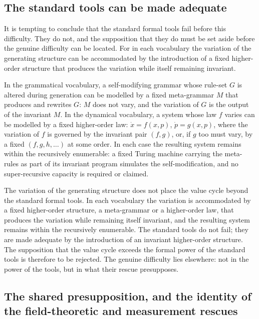 \subsection{The standard tools can be made adequate}
\label{p10:sec:mod-rescue}

It is tempting to conclude that the standard formal tools fail before this difficulty. They do not, and the supposition that they do must be set aside before the genuine difficulty can be located. For in each vocabulary the variation of the generating structure can be accommodated by the introduction of a fixed higher-order structure that produces the variation while itself remaining invariant.

In the grammatical vocabulary, a self-modifying grammar whose rule-set $G$ is altered during generation can be modelled by a fixed meta-grammar $M$ that produces and rewrites $G$: $M$ does not vary, and the variation of $G$ is the output of the invariant $M$. In the dynamical vocabulary, a system whose law $f$ varies can be modelled by a fixed higher-order law: $\dot{x} = f(x, p)$, $\dot{p} = g(x, p)$, where the variation of $f$ is governed by the invariant pair $(f, g)$, or, if $g$ too must vary, by a fixed $(f, g, h, \dots)$ at some order. In each case the resulting system remains within the recursively enumerable: a fixed Turing machine carrying the meta-rules as part of its invariant program simulates the self-modification, and no super-recursive capacity is required or claimed.

\begin{claim}
The variation of the generating structure does not place the value cycle beyond the standard formal tools. In each vocabulary the variation is accommodated by a fixed higher-order structure, a meta-grammar or a higher-order law, that produces the variation while remaining itself invariant, and the resulting system remains within the recursively enumerable. The standard tools do not fail; they are made adequate by the introduction of an invariant higher-order structure. The supposition that the value cycle exceeds the formal power of the standard tools is therefore to be rejected. The genuine difficulty lies elsewhere: not in the power of the tools, but in what their rescue presupposes.
\end{claim}

\subsection{The shared presupposition, and the identity of the field-theoretic and measurement rescues}
\label{p10:sec:mod-shared}

